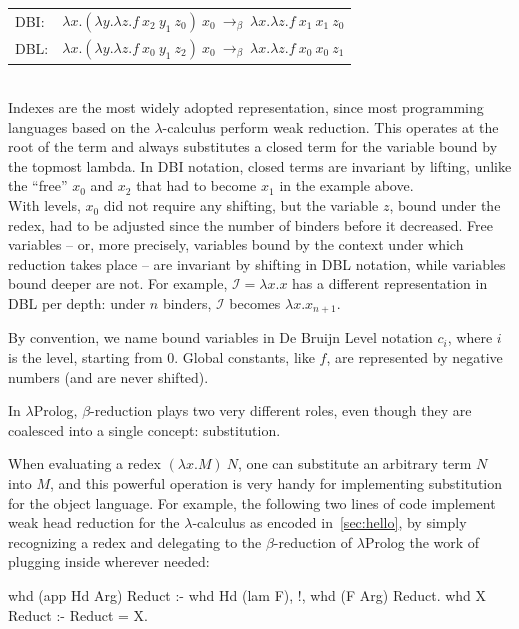 \documentclass[a4paper, 11pt]{book}
\begin{document}
\noindent
\begin{tabular}{ll}
DBI: & $\lambda x.(\lambda y.\lambda z.f\ x_2\ y_1\ z_0)\ x_0\ \to_\beta\ \lambda x.\lambda z.f\ x_1\ x_1\ z_0$\\
DBL: & $\lambda x.(\lambda y.\lambda z.f\ x_0\ y_1\ z_2)\ x_0\ \to_\beta\ \lambda x.\lambda z.f\ x_0\ x_0\ z_1$\\
\end{tabular}
~\\


Indexes are the most widely adopted representation, since most programming
languages based on the $\lambda$-calculus perform weak reduction. This
operates at the root of the term and always substitutes a closed term for the
variable bound by the topmost lambda. In DBI notation, closed terms are
invariant by lifting, unlike the ``free'' $x_0$ and $x_2$ that had to become
$x_1$ in the example above.\\
With levels, $x_0$ did not require any shifting, but the variable $z$, bound
under the redex, had to be adjusted since the number of binders before it
decreased. Free variables -- or, more precisely, variables bound by the context
under which reduction takes place -- are invariant by shifting in DBL notation,
while variables bound deeper are not. For example, $\mathcal{I} = \lambda x.x$
has a different representation in DBL per depth: under $n$ binders,
$\mathcal{I}$ becomes $\lambda x.x_{n+1}$.


By convention, we name bound variables in De Bruijn Level notation $c_i$, where
$i$ is the level, starting from $0$. Global constants, like $f$, are
represented by negative numbers (and are never shifted).


In $\lambda$Prolog, $\beta$-reduction plays two very different roles, even
though they are coalesced into a single concept: substitution.


When evaluating a redex $(\lambda x.M)\ N$, one can substitute an arbitrary
term $N$ into $M$, and this powerful operation is very handy for implementing substitution
for the object language. For example, the following two lines of code
implement weak head reduction for the $\lambda$-calculus as encoded
in~\cref{sec:hello}, by simply recognizing a redex and delegating to the
$\beta$-reduction of $\lambda$Prolog the work of plugging  inside
wherever needed:

\begin{elpicode}
whd (app Hd Arg) Reduct :- whd Hd (lam F), !, whd (F Arg) Reduct.
whd X Reduct :- Reduct = X.
\end{elpicode}
\end{document}
